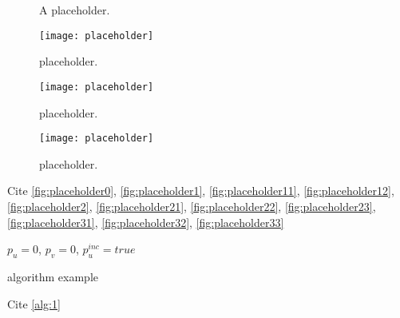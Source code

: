 \begin{figure*}[!htb]
  \begin{center}
      \caption{A placeholder.}\label{fig:placeholder2}
  \end{center}
\end{figure*}

\begin{figure*}[!htb]
    \begin{minipage}[t]{0.33\linewidth}
        \centering
        \texttt{[image: placeholder]}
        \caption{placeholder.}
        \label{fig:placeholder31}
    \end{minipage}
    \hfill
    \begin{minipage}[t]{0.33\linewidth}
        \centering
        \texttt{[image: placeholder]}
        \caption{placeholder.}
        \label{fig:placeholder32}
    \end{minipage}
    \hfill
    \begin{minipage}[t]{0.33\linewidth}
        \centering
        \texttt{[image: placeholder]}
        \caption{placeholder.}
        \label{fig:placeholder33}
    \end{minipage}
\end{figure*}
Cite \autoref{fig:placeholder0}, \autoref{fig:placeholder1}, \autoref{fig:placeholder11}, \autoref{fig:placeholder12}, \autoref{fig:placeholder2}, \autoref{fig:placeholder21}, \autoref{fig:placeholder22}, \autoref{fig:placeholder23}, \autoref{fig:placeholder31}, \autoref{fig:placeholder32}, \autoref{fig:placeholder33}

\begin{algorithm}[!htb]
$p_u = 0$, $p_v = 0$, $p_u^{inc} = true$\;
\caption{algorithm example}\label{alg:1}
\end{algorithm}
Cite \autoref{alg:1}

